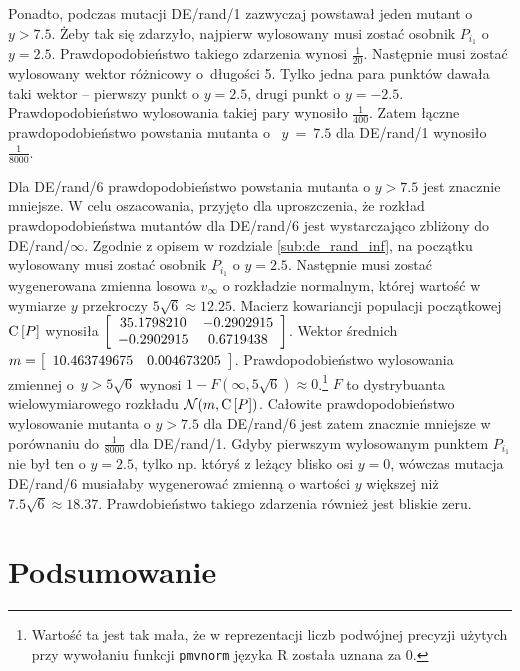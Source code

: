 \documentclass[a4paper,onecolumn,oneside,12pt,wide,floatssmall]{mwrep}
\def\C{{\rm C}\,}
\theoremstyle{definition}
\theoremstyle{plain}%
\theoremstyle{remark}
\begin{document}
Ponadto, podczas mutacji DE/rand/1 zazwyczaj powstawał jeden mutant o $y > 7.5$. 
Żeby tak się zdarzyło, najpierw wylosowany musi zostać osobnik $P_{i_1}$ o~$y=2.5$.
Prawdopodobieństwo takiego zdarzenia wynosi $\frac{1}{20}$.
Następnie musi zostać wylosowany wektor różnicowy o~długości 5. Tylko jedna para punktów 
dawała taki wektor --
pierwszy punkt o $y = 2.5$, drugi punkt o $y = -2.5$. 
Prawdopodobieństwo wylosowania takiej pary wynosiło $\frac{1}{400}$. 
Zatem łączne prawdopodobieństwo powstania mutanta o~
$y~=~7.5$ dla DE/rand/1 wynosiło $\frac{1}{8000}$. 

Dla DE/rand/6 prawdopodobieństwo powstania mutanta o $y > 7.5$ jest znacznie mniejsze.
W celu oszacowania, przyjęto dla uproszczenia, że rozkład prawdopodobieństwa mutantów dla
DE/rand/6 jest wystarczająco zbliżony do DE/rand/$\infty$.
Zgodnie z opisem w rozdziale \ref{sub:de_rand_inf}, na początku wylosowany musi zostać osobnik 
$P_{i_1}$ o $y = 2.5$. Następnie musi zostać wygenerowana zmienna losowa 
$v_\infty$ o rozkładzie normalnym, której wartość w wymiarze $y$
przekroczy $5\sqrt{6} \approx 12.25$. Macierz kowariancji populacji początkowej  
$\C[P]$ wynosiła $\left[ \begin{array}{ c c }
  35.1798210 & -0.2902915 \\
  -0.2902915 &  0.6719438
\end{array} \right]$.
Wektor średnich~$m=\left[ \begin{array}{ c c } 10.463749675 & 0.004673205 \end{array} \right]$.
Prawdopodobieństwo wylosowania zmiennej o~$y > 5\sqrt{6}$ wynosi 
$1 - F(\infty, 5\sqrt{6}) \approx 0$.\footnote{Wartość ta jest tak mała,
że w reprezentacji liczb podwójnej precyzji użytych przy wywołaniu funkcji \texttt{pmvnorm} języka R
została uznana za 0.} $F$ to
dystrybuanta wielowymiarowego rozkładu $\mathcal{N}(m, \C[P])$.
Całowite prawdopodobieństwo wylosowanie mutanta o $y > 7.5$ dla DE/rand/6 jest zatem 
znacznie mniejsze w porównaniu do
$\frac{1}{8000}$ dla DE/rand/1.
Gdyby pierwszym wylosowanym punktem $P_{i_1}$ nie był ten o $y = 2.5$, tylko np. któryś 
z leżący blisko osi $y = 0$, wówczas mutacja DE/rand/6 musiałaby wygenerować zmienną
o wartości $y$ większej niż $7.5\sqrt{6} \approx 18.37$. 
Prawdobieństwo takiego zdarzenia również jest bliskie zeru.

\chapter{Podsumowanie}
\end{document}
